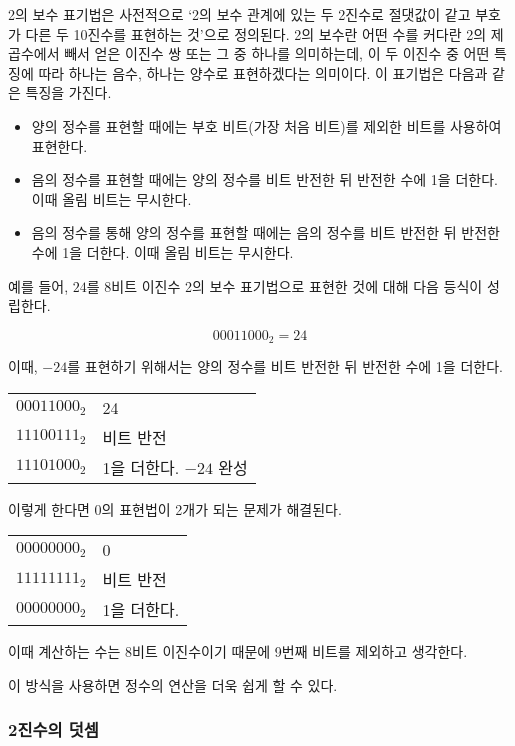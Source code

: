 \documentclass{article}
\begin{document}
2의 보수 표기법은 사전적으로 `2의 보수 관계에 있는 두 2진수로 절댓값이 같고 부호가
다른 두 10진수를 표현하는 것'으로 정의된다. 2의 보수란 어떤 수를 커다란 2의 제곱수에서
빼서 얻은 이진수 쌍 또는 그 중 하나를 의미하는데, 이 두 이진수 중 어떤 특징에 따라
하나는 음수, 하나는 양수로 표현하겠다는 의미이다. 이 표기법은 다음과 같은 특징을 가진다.

\begin{itemize}
    \item 양의 정수를 표현할 때에는 부호 비트(가장 처음 비트)를 제외한 비트를 사용하여 표현한다.
    \item 음의 정수를 표현할 때에는 양의 정수를 비트 반전한 뒤 반전한 수에 1을 더한다. 이때 올림 비트는 무시한다.
    \item 음의 정수를 통해 양의 정수를 표현할 때에는 음의 정수를 비트 반전한 뒤 반전한 수에 1을 더한다. 이때 올림 비트는 무시한다.
\end{itemize}

예를 들어, $24$를 8비트 이진수 2의 보수 표기법으로 표현한 것에 대해 다음 등식이 성립한다.

$$
00011000_2 = 24
$$

이때, $-24$를 표현하기 위해서는 양의 정수를 비트 반전한 뒤 반전한 수에 1을 더한다.

\begin{center}
    \begin{tabular}{rl}
        $00011000_2$ & 24 \\
        $11100111_2$ & 비트 반전 \\
        $11101000_2$ & 1을 더한다. $-24$ 완성
    \end{tabular}
\end{center}

이렇게 한다면 0의 표현법이 2개가 되는 문제가 해결된다.

\begin{center}
    \begin{tabular}{rl}
        $00000000_2$ & 0 \\
        $11111111_2$ & 비트 반전 \\
        $00000000_2$ & 1을 더한다.
    \end{tabular}
\end{center}

이때 계산하는 수는 8비트 이진수이기 때문에 9번째 비트를 제외하고 생각한다.

이 방식을 사용하면 정수의 연산을 더욱 쉽게 할 수 있다.

\subsubsection{2진수의 덧셈}
\end{document}
